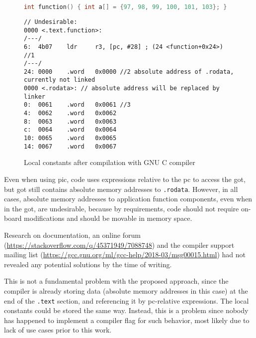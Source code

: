\begin{figure} [h]
\begin{lstlisting}[language=C]
int function() { int a[] = {97, 98, 99, 100, 101, 103}; }
\end{lstlisting}
\begin{lstlisting}[style=asm]
// Undesirable:
0000 <.text.function>:
/---/
6:  4b07    ldr     r3, [pc, #28] ; (24 <function+0x24>) //1
/---/
24: 0000    .word   0x0000 //2 absolute address of .rodata, currently not linked
0000 <.rodata>: // absolute address will be replaced by linker
0:  0061    .word   0x0061 //3
4:  0062    .word   0x0062
8:  0063    .word   0x0063
c:  0064    .word   0x0064
10: 0065    .word   0x0065
14: 0067    .word   0x0067
\end{lstlisting}
\caption{Local constants after compilation with GNU C compiler}
\label{fig:rodata}
\end{figure}

Even when using \gls{pic}, code uses expressions relative to the \gls{pc} to access the \gls{got}, but \gls{got} still contains absolute memory addresses to \texttt{.rodata}. However, in all cases, absolute memory addresses to application function components, even when in the \gls{got}, are undesirable, because by requirements, code should not require on-board modifications and should be movable in memory space.

Research on documentation, an online forum (\url{https://stackoverflow.com/q/45371949/7088748}) and the compiler support mailing list (\url{https://gcc.gnu.org/ml/gcc-help/2018-03/msg00015.html}) had not revealed any potential solutions by the time of writing.

This is not a fundamental problem with the proposed approach, since the compiler is already storing data (absolute memory addresses in this case) at the end of the \texttt{.text} section, and referencing it by \gls{pc}-relative expressions. The local constants could be stored the same way. Instead, this is a problem since nobody has happened to implement a compiler flag for such behavior, most likely due to lack of use cases prior to this work.
